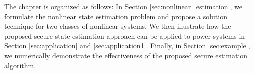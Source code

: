 \documentclass[../thesis.tex]{subfiles}
\begin{document}
The chapter is organized as follows: In Section \ref{sec:nonlinear_estimation}, we formulate the nonlinear state estimation problem and propose a solution technique for two classes of nonlinear systems. We then illustrate how the proposed secure state estimation approach can be applied to power systems in Section \ref{sec:application} and \ref{sec:application1}. Finally, in Section \ref{sec:example}, we numerically demonstrate the effectiveness of the proposed secure estimation algorithm.
\end{document}
